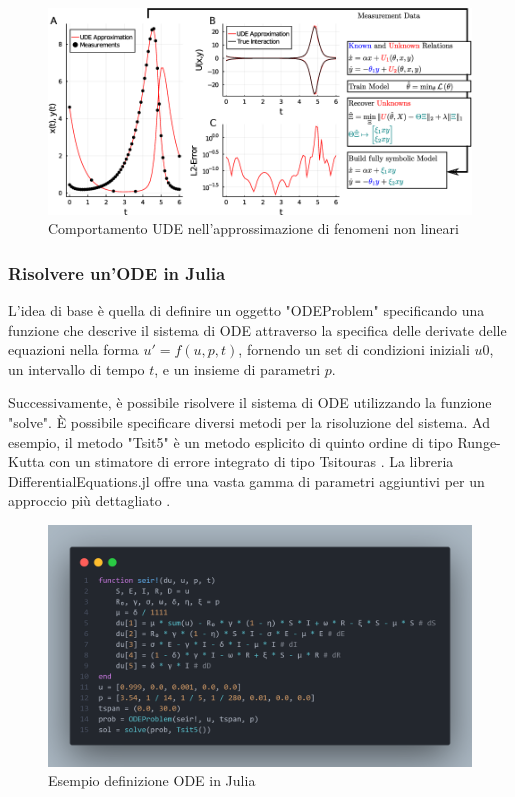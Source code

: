 \begin{figure}[H]
    \begin{center}
        \includegraphics[scale=0.35]{img/ude_approx.png}
        \caption{Comportamento UDE nell'approssimazione di fenomeni non lineari \cite{rackauckas2020universal}}
        \label{fig:UDE_approx}
    \end{center}
\end{figure}

\subsubsection*{Risolvere un'ODE in Julia}

L'idea di base è quella di definire un oggetto "ODEProblem" specificando 
una funzione che descrive il sistema di ODE attraverso la specifica 
delle derivate delle equazioni nella forma $u' = f(u, p, t)$, fornendo 
un set di condizioni iniziali $u0$, un intervallo di tempo $t$, e un 
insieme di parametri $p$.

Successivamente, è possibile risolvere il sistema di ODE utilizzando la 
funzione "solve". È possibile specificare diversi metodi per la 
risoluzione del sistema. Ad esempio, il metodo "Tsit5" è un metodo 
esplicito di quinto ordine di tipo Runge-Kutta con un stimatore di 
errore integrato di tipo Tsitouras \cite{10.1016/j.camwa.2011.06.002}. 
La libreria DifferentialEquations.jl offre una vasta gamma di parametri 
aggiuntivi per un approccio più dettagliato \cite{rackauckas2017differentialequations}.

\begin{figure}[H]
    \begin{center}
        \includegraphics[width=\textwidth]{img/fdefinition.png}
        \caption{Esempio definizione ODE in Julia}
        \label{fig:ODE_Julia_example}
    \end{center}
\end{figure}

